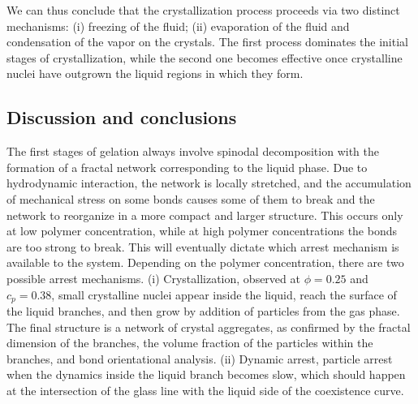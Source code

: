 \documentclass[a4paper,preprint,superscriptaddress]{revtex4}
\begin{document}
We can thus conclude that the crystallization process proceeds via two distinct mechanisms:
(i) freezing of the fluid; (ii) evaporation of the fluid and condensation of the vapor on the crystals.
The first process dominates the initial stages of crystallization, while the second one becomes effective once
crystalline nuclei have outgrown the liquid regions in which they form. 
% 

\subsection*{Discussion and conclusions}
The first stages of gelation always involve spinodal decomposition with the formation
of a fractal network corresponding to the liquid phase.
Due to hydrodynamic interaction, the network is locally stretched, and the accumulation of mechanical stress on some bonds causes some
of them to break and the network to reorganize in a more compact and larger structure. This occurs only at low polymer concentration,
while at high polymer concentrations the bonds are too strong to break. This will eventually dictate which arrest mechanism
is available to the system.
Depending on the polymer concentration, there are two possible arrest mechanisms.
(i) Crystallization, observed at $\phi=0.25$ and $c_p=0.38$, small crystalline nuclei appear inside the liquid, reach the surface
 of the liquid branches, and then grow by addition of particles from the gas phase. The final structure is a network of crystal aggregates,
 as confirmed by the fractal dimension of the branches, the volume fraction of the particles within the branches, and bond orientational analysis.
(ii) Dynamic arrest, particle arrest when the dynamics inside the liquid branch becomes slow, which should happen at the intersection of the
 glass line with the liquid side of the coexistence curve.
\end{document}
